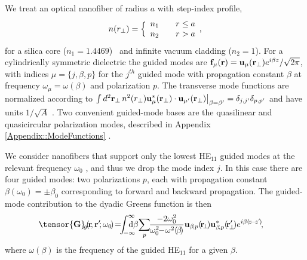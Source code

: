 \documentclass[aps,pra,twocolumn]{revtex4-1} %
\begin{document}
We treat an optical nanofiber of radius $a$ with step-index profile,
	\begin{align} \label{Eq::IndexofRefraction}
		n(r_\perp) = \Big\{  
			\begin{array}{l l} n_1 & \quad r \leq a \\
						 n_2 & \quad r > a 
		\end{array},
	\end{align}
for a silica core ($n_1 = 1.4469$)~\cite{kien_field_2004} and infinite vacuum cladding ($n_2 = 1$).  For a cylindrically symmetric dielectric the guided modes are $\mathbf{f}_\mu (\mathbf{r}) = \mathbf{u}_\mu (\mathbf{r}_\perp) e^{i\beta z}/\sqrt{2 \pi}$, with indices $\mu=\{j, \beta , p\}$ for the $j^{th}$ guided mode with propagation constant $\beta$ at frequency $\omega_\mu=\omega(\beta)$ and polarization $p$.  The transverse mode functions are normalized according to $\int d^2 \mathbf{r}_\perp \, n^2(r_\perp)\mathbf{u}^*_\mu (\mathbf{r}_\perp) \cdot \mathbf{u}_{\mu'} (\mathbf{r}_\perp)\big|_{\beta = \beta'} = \delta_{j,j'}\delta_{p,p'}$ and have units $1/\sqrt{A}$ \cite{le_kien_anisotropy_2014}.  Two convenient guided-mode bases are the quasilinear and quasicircular polarization modes, described in Appendix \ref{Appendix::ModeFunctions} \cite{kien_field_2004}.  

We consider nanofibers that support only the lowest HE$_{11}$ guided modes at the relevant frequency $\omega_0$ \cite{snyder_optical_1983}, and thus we drop the mode index $j$.  In this case there are four guided modes: two polarizations $p$, each with propagation constant $\beta(\omega_0) = \pm\beta_0$ corresponding to forward and backward propagation.  The guided-mode contribution to the dyadic Greens function is then
	\begin{align} \label{Eq::GreensEigenmodes}
		\tensor{\mathbf{G}}\!_g\!(\!\br\!,\br'\!; \omega_0\!) \!=&\!\! \int_{\!-\infty}^\infty \!\!\!\!\!\! \mathrm{d} \beta \!\sum_{p} \!\!
\frac{-2\omega_0^2}{\omega_0^2\!\!-\!\omega^2(\!\beta\!)} \mathbf{u}_{\beta\!,p} (\!\br\!_\perp\!)\mathbf{u}^*_{\beta\!,p} 
(\!\br_{\!\perp}^\prime\!) e^{i\beta(\!z\!-\!z'\!)}\!,
	\end{align}
where $ \omega(\beta)$ is the frequency of the guided HE$_{11}$ for a given $\beta$.  
\end{document}
